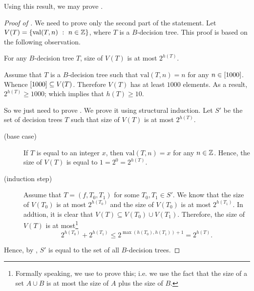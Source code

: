 Using this result, we may prove .
\begin{proof}[Proof of ]
  We need to prove only the second part of the statement.
  Let $V(T) = \set[n \in \Z]{\mathrm{val}(T, n)}$, where $T$ is a $B$-decision
  tree. This proof is based on the following observation.
  \begin{claim}
  \label{claim:guess-the-number}
    For any $B$-decision tree $T$, size of $V(T)$ is at most $2^{h(T)}$.
  \end{claim}

  Assume that $T$ is a $B$-decision tree such that $\mathrm{val}(T, n) = n$ for
  any $n \in {[{1000}]}$. Whence ${[{1000}]} \subseteq V(T)$. Therefore 
  $V(T)$ has at least $1000$ elements. As a result, $2^{h(T)} \ge 1000$;
  which implies that $h(T) \ge 10$.

  So we just need to prove . We prove it using
  structural induction. Let $S'$ be the set of decision trees $T$ such that size
  of $V(T)$ is at most $2^{h(T)}$.
  \begin{description}
    \item[(base case)] If $T$ is equal to an integer $x$, then 
      $\mathrm{val}(T, n) = x$ for any $n \in {\mathbb{Z}}$. Hence, the size of $V(T)$ is
      equal to $1 = 2^0 = 2^{h(T)}$.
    \item[(induction step)] Assume that $T = (f, T_0, T_1)$ for some 
      $T_0, T_1 \in S'$. We know that the size of $V(T_0)$ is at most
      $2^{h(T_0)}$ and the size of $V(T_0)$ is at most $2^{h(T_1)}$. In 
      addtion, it is clear that $V(T) \subseteq V(T_0) \cup V(T_1)$. Therefore,
      the size of $V(T)$ is at most\footnote{%
        Formally speaking, we use  to prove
        this; i.e. we use the fact that the size of a set $A \cup B$ is at most
        the size of $A$ plus the size of $B$.
      }
      \[
        2^{h(T_0)} + 2^{h(T_1)} \le 2^{\max(h(T_0), h(T_1)) + 1} = 2^{h(T)}.
      \]
  \end{description}
  Hence, by , $S'$ is equal to the set of all
  $B$-decision trees.
\end{proof}

